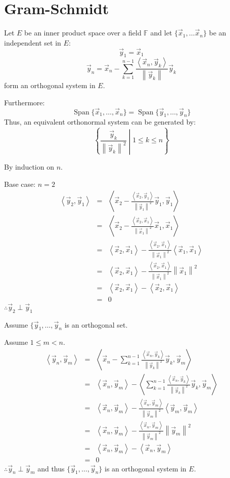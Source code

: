 \documentclass[letterpaper,12pt,fleqn]{article}
\newcommand{\vx}{\vec{x}}
\newcommand{\vy}{\vec{y}}
\newcommand{\norm}[1]{\left\|#1\right\|}
\newcommand{\inner}[1]{\left<#1\right>}
\newcommand{\F}{\mathbb{F}}
\DeclareMathOperator{\spn}{Span}
\begin{document}
\section*{Gram-Schmidt}

\begin{theorem}
  Let $E$ be an inner product space over a field $\F$ and let
  $\{\vx_1,\ldots\vx_n\}$ be an independent set in $E$:
  \[\vy_1=\vx_1\]
  \[\vy_n=\vx_n-\sum_{k=1}^{n-1}\frac{\inner{\vx_n,\vy_k}}{\norm{\vy_k}}\vy_k\]
  form an orthogonal system in $E$.
  
  Furthermore:
  \[\spn\{\vx_1,\ldots,\vx_n\}=\spn\{\vy_1,\ldots,\vy_n\}\]
  Thus, an equivalent orthonormal system can be generated by:
  \[\left\{\frac{\vy_k}{\norm{\vy_k}^2}\middle|1\le k\le n\right\}\]
\end{theorem}

\begin{theproof}
  By induction on $n$.
  \begin{description}
  \item Base case: $n=2$
    \begin{eqnarray*}
      \inner{\vy_2,\vy_1} &=&
      \inner{\vx_2-\frac{\inner{\vx_2,\vy_1}}{\norm{\vy_1}^2}\vy_1,\vy_1} \\
      &=& \inner{\vx_2-\frac{\inner{\vx_2,\vx_1}}{\norm{\vx_1}^2}\vx_1,\vx_1} \\
      &=& \inner{\vx_2,\vx_1}-
      \frac{\inner{\vx_2,\vx_1}}{\norm{\vx_1}^2}\inner{\vx_1,\vx_1} \\
      &=& \inner{\vx_2,\vx_1}-
      \frac{\inner{\vx_2,\vx_1}}{\norm{\vx_1}^2}\norm{\vx_1}^2 \\
      &=& \inner{\vx_2,\vx_1}-\inner{\vx_2,\vx_1} \\
      &=& 0
    \end{eqnarray*}
    $\therefore\vy_2\perp\vy_1$

  \item Assume $\{\vy_1,\ldots,\vy_n$ is an orthogonal set.

  \item Assume $1\le m<n$.
    \begin{eqnarray*}
      \inner{\vy_n,\vy_m} &=& 
      \inner{\vx_n-
        \sum_{k=1}^{n-1}\frac{\inner{\vx_n,\vy_k}}{\norm{\vy_k}^2}\vy_k,\vy_m} \\
      &=& \inner{\vx_n,\vy_m}-
      \inner{\sum_{k=1}^{n-1}\frac{\inner{\vx_n,\vy_k}}{\norm{\vy_k}^2}\vy_k,
        \vy_m} \\
      &=& \inner{\vx_n,\vy_m}-
      \frac{\inner{\vx_n,\vy_m}}{\norm{\vy_m}^2}\inner{\vy_m,\vy_m} \\
      &=& \inner{\vx_n,\vy_m}-
      \frac{\inner{\vx_n,\vy_m}}{\norm{\vy_m}^2}\norm{\vy_m}^2 \\
      &=& \inner{\vx_n,\vy_m}-\inner{\vx_n,\vy_m} \\
      &=& 0
    \end{eqnarray*}
    $\therefore\vy_n\perp\vy_m$ and thus $\{\vy_1,\ldots,\vy_n\}$ is an
    orthogonal system in $E$.
  \end{description}
\end{theproof}
\end{document}
